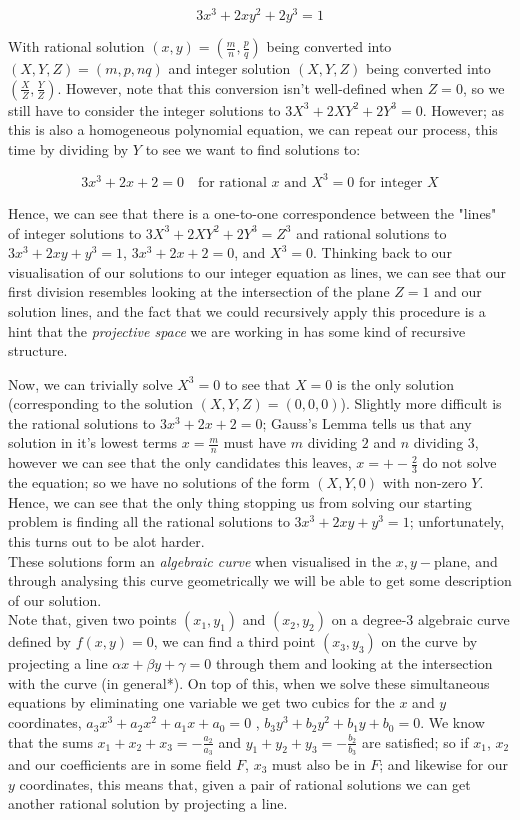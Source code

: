 \documentclass{article}
\begin{document}
 \[3x^3 + 2xy^2 + 2y^3 = 1\]
 
With rational solution $(x, y) = (\frac{m}{n}, \frac{p}{q})$ being converted into $(X, Y, Z) = (m, p, nq)$ and integer solution $(X, Y, Z)$ being converted into $(\frac{X}{Z}, \frac{Y}{Z})$. However, note that this conversion isn't well-defined when $Z = 0$, so we still have to consider the integer solutions to $3 X^3 +  2 X Y^2 + 2 Y^3 = 0$. However; as this is also a homogeneous polynomial equation, we can repeat our process, this time by dividing by $Y$ to see we want to find solutions to: 

\[3 x^3 + 2 x + 2 = 0 \quad \text{for rational $x$ and $X^3 = 0$ for integer $X$}\]

Hence, we can see that there is a one-to-one correspondence between the "lines" of integer solutions to $3 X^3 +  2 X Y^2 + 2 Y^3 = Z^3$ and rational solutions to  $3x^3 + 2xy + y^3 = 1$, \quad $3 x^3 + 2 x + 2 = 0$, and $X^3 = 0$. Thinking back to our visualisation of our solutions to our integer equation as lines, we can see that our first division resembles looking at the intersection of the plane $Z = 1$ and our solution lines, and the fact that we could recursively apply this procedure is a hint that the \emph{projective space} we are working in has some kind of recursive structure.

Now, we can trivially solve $X^3 = 0 $ to see that $X = 0$ is the only solution (corresponding to the solution $(X, Y, Z) = (0, 0, 0)$). Slightly more difficult is the rational solutions to $3x^3 + 2 x + 2 = 0$; Gauss's Lemma tells us that any solution in it's lowest terms $x = \frac{m}{n}$ must have $m$ dividing $2$ and $n$ dividing $3$, however we can see that the only candidates this leaves, $x = +-\frac{2}{3}$ do not solve the equation; so we have no solutions of the form $(X, Y, 0)$ with non-zero $Y$. Hence, we can see that the only thing stopping us from solving our starting problem is finding all the rational solutions to  $3x^3 + 2xy + y^3 = 1$; unfortunately, this turns out to be alot harder. \\

These solutions form an \emph{algebraic curve} when visualised in the $x,y-$plane, and through analysing this curve geometrically we will be able to get some description of our solution.\\

Note that, given two points $(x_1, y_1)$ and $(x_2, y_2)$ on a degree-3 algebraic curve defined by $f(x, y) = 0$, we can find a third point $(x_3, y_3)$ on the curve by projecting a line $\alpha x + \beta y + \gamma = 0$ through them and looking at the intersection with the curve (in general*). On top of this, when we solve these simultaneous equations by eliminating one variable we get two cubics for the $x$ and $y$ coordinates, $a_3 x^3 + a_2 x^2 + a_1 x + a_0 = 0$ , \quad $b_3 y^3 + b_2 y^2 + b_1 y + b_0 = 0$. We know that the sums $x_1 + x_2 + x_3 = -\frac{a_2}{a_3}$ and $y_1 + y_2 + y_3 = -\frac{b_2}{b_3}$ are satisfied; so if $x_1$, $x_2$ and our coefficients are in some field $F$, $x_3$ must also be in $F$; and likewise for our $y$ coordinates, this means that, given a pair of rational solutions we can get another rational solution by projecting a line.
\end{document}
